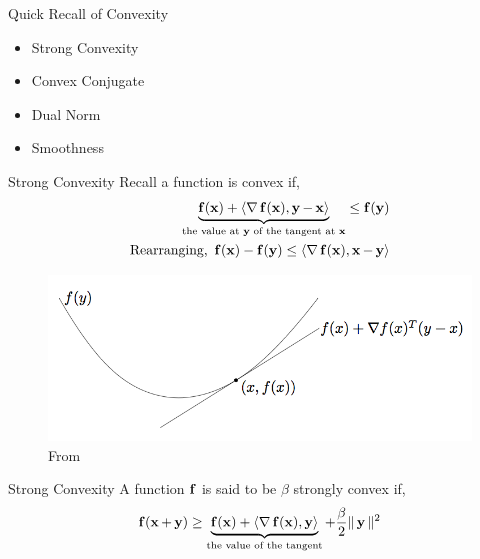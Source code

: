 

\begin{frame}{Quick Recall of Convexity}
  \begin{itemize}
  \item Strong Convexity
  \item Convex Conjugate
  \item Dual Norm
  \item Smoothness
  \end{itemize}
\end{frame}

\begin{frame}{Strong Convexity}
  Recall a function is convex if,
  \begin{align*} 
    \underbrace{\f(\x) + \dotprod{\grad \f(\x)}{\y-\x}}_{\text{the value at $\y$ of the tangent at $\x$}} \le \f(\y) \\
    \text{Rearranging, } \f(\x)-\f(\y) \le \dotprod{\grad \f(\x)} {\x-\y} \\
  \end{align*}
  \begin{figure}
    \includegraphics[scale=0.27]{images/convexity.png}
    \caption{From \cite{BV2004}}
  \end{figure}
\end{frame}

\begin{frame}{Strong Convexity}
  A function $\f$ is said to be $\beta$ strongly convex if,
  \begin{align*}
    \f(\x+\y) \ge \underbrace{\f(\x) + \dotprod{\grad \f(\x)}{\y}}_{\text{the value of the tangent}} +\frac{\beta}{2} \|\y\|^2
  \end{align*}
\end{frame}

